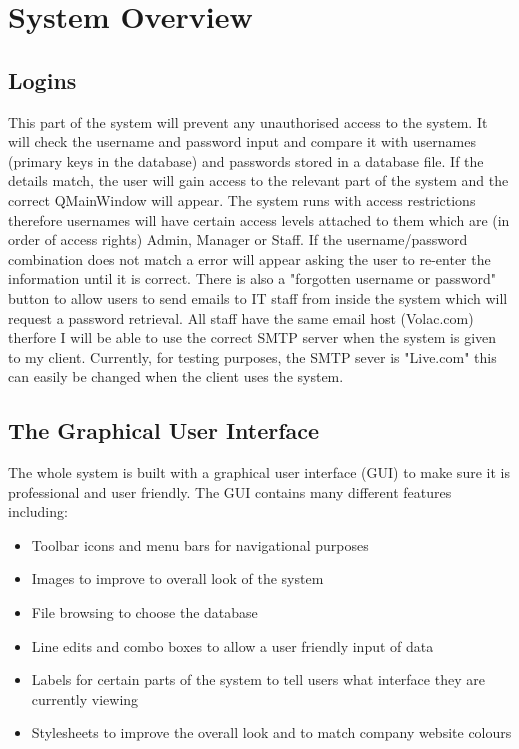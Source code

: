 \section{System Overview}

\subsection{Logins}

This part of the system will prevent any unauthorised access to the system. It will check the username and password input and compare it with usernames (primary keys in the database) and passwords stored in a database file. If the details match, the user will gain access to the relevant part of the system and the correct QMainWindow will appear. The system runs with access restrictions therefore usernames will have certain access levels attached to them which are (in order of access rights) Admin, Manager or Staff. If the username/password combination does not match a error will appear asking the user to re-enter the information until it is correct. There is also a "forgotten username or password" button to allow users to send emails to IT staff from inside the system which will request a password retrieval. All staff have the same email host (Volac.com) therfore I will be able to use the correct SMTP server when the system is given to my client. Currently, for testing purposes, the SMTP sever is "Live.com" this can easily be changed when the client uses the system.

\subsection{The Graphical User Interface}

The whole system is built with a graphical user interface (GUI) to make sure it is professional and user friendly. The GUI contains many different features including:
\begin{itemize}
\item Toolbar icons and menu bars for navigational purposes
\item Images to improve to overall look of the system
\item File browsing to choose the database
\item Line edits and combo boxes to allow a user friendly input of data
\item Labels for certain parts of the system to tell users what interface they are currently viewing
\item Stylesheets to improve the overall look and to match company website colours
\end{itemize}

